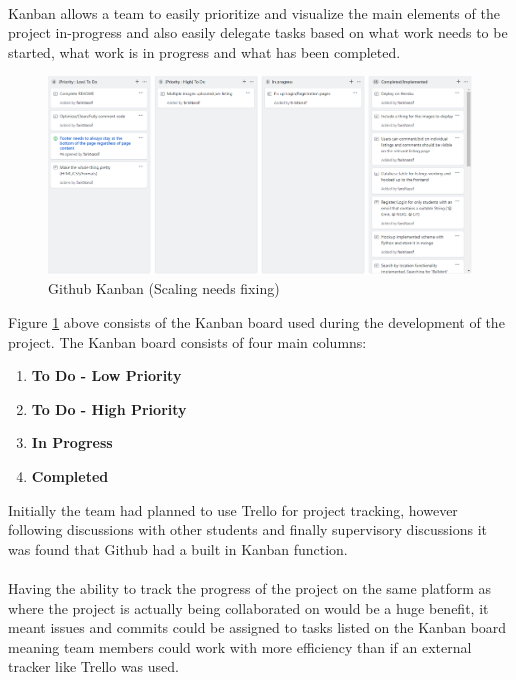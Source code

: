 \paragraph{}
Kanban allows a team to easily prioritize and visualize the main elements of the project in-progress and also easily delegate tasks based on what work needs to be started, what work is in progress and what has been completed.

\begin{figure}[H]
	\caption{Github Kanban (Scaling needs fixing)}
	\label{image:kanban}
	\centering
	\includegraphics[width=1\textwidth]{images/kanban.png}
\end{figure}

Figure \ref{image:kanban} above consists of the Kanban board used during the development of the project. The Kanban board consists of four main columns:

\begin{enumerate}
  \item \textbf{To Do - Low Priority}
  \item \textbf{To Do - High Priority}
  \item \textbf{In Progress}
  \item \textbf{Completed}
\end{enumerate}

Initially the team had planned to use Trello \cite{TRELLO} for project tracking, however following discussions with other students and finally supervisory discussions it was found that Github had a built in Kanban function. 

\paragraph{}
Having the ability to track the progress of the project on the same platform as where the project is actually being collaborated on would be a huge benefit, it meant issues and commits could be assigned to  tasks listed on the Kanban board meaning team members could work with more efficiency than if an external tracker like Trello was used.

